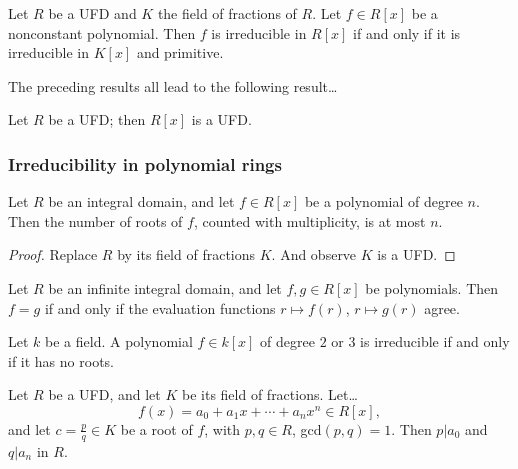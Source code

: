 \begin{corollary}
Let $R$ be a UFD and $K$ the field of fractions of $R$. Let $f \in R[x]$ be a nonconstant polynomial. Then $f$ is irreducible in $R[x]$ if and only if
it is irreducible in $K[x]$ and primitive.
\end{corollary}

\noindent The preceding results all lead to the following result\dots

\begin{theorem}
Let $R$ be a UFD; then $R[x]$ is a UFD.
\end{theorem}

\subsubsection{Irreducibility in polynomial rings}

\begin{lemma}
Let $R$ be an integral domain, and let $f \in R[x]$ be a polynomial of degree $n$. Then the number of roots of $f$, counted with multiplicity, is at most $n$.
\end{lemma}

\begin{proof}
Replace $R$ by its field of fractions $K$. And observe $K$ is a UFD.
\end{proof}

\begin{corollary}
Let $R$ be an infinite integral domain, and let $f,g \in R[x]$ be polynomials. Then $f = g$ if and only if the evaluation functions $r \mapsto f(r)$,
$r \mapsto g(r)$ agree.
\end{corollary}

\begin{proposition}
Let $k$ be a field. A polynomial $f \in k[x]$ of degree $2$ or $3$ is irreducible if and only if it has no roots.
\end{proposition}

\begin{proposition}
Let $R$ be a UFD, and let $K$ be its field of fractions. Let\dots
$$f(x) = a_0 + a_1 x + \cdots + a_n x^n \in R[x],$$
and let $c = \frac{p}{q} \in K$ be a root of $f$, with $p,q \in R$, gcd$(p,q) = 1$. Then $p | a_0$ and $q | a_n$ in $R$.
\end{proposition}